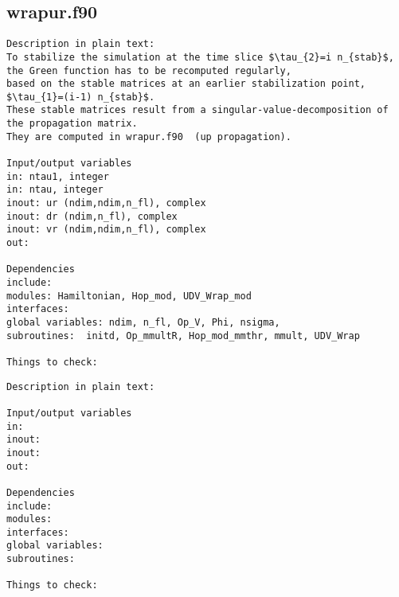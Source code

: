 \subsection{wrapur.f90}
\begin{verbatim}
Description in plain text:
To stabilize the simulation at the time slice $\tau_{2}=i n_{stab}$, 
the Green function has to be recomputed regularly, 
based on the stable matrices at an earlier stabilization point, $\tau_{1}=(i-1) n_{stab}$.
These stable matrices result from a singular-value-decomposition of the propagation matrix.
They are computed in wrapur.f90  (up propagation).

Input/output variables
in: ntau1, integer
in: ntau, integer
inout: ur (ndim,ndim,n_fl), complex
inout: dr (ndim,n_fl), complex
inout: vr (ndim,ndim,n_fl), complex
out:

Dependencies
include: 
modules: Hamiltonian, Hop_mod, UDV_Wrap_mod
interfaces: 
global variables: ndim, n_fl, Op_V, Phi, nsigma, 
subroutines:  initd, Op_mmultR, Hop_mod_mmthr, mmult, UDV_Wrap

Things to check:

\end{verbatim}
\clearpage


\begin{verbatim}
Description in plain text:

Input/output variables
in: 
inout: 
inout: 
out:

Dependencies
include: 
modules: 
interfaces: 
global variables:  
subroutines:  

Things to check:
\end{verbatim}